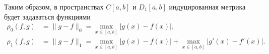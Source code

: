 Таким образом, в пространствах $ C[a,b] $ и $ D_1[a,b] $ индуцированная метрика
будет задаваться функциями  
\begin{align*}
  \rho_0(f, g) &= \|g - f\|_0 = \max_{x\in[a,b]}|g(x)-f(x)|,\\
  \rho_1(f, g) &= \|g - f \|_1 = \max_{x\in[a,b]}|g(x)-f(x)| +
  \max_{x\in[a,b]}|g'(x)-f'(x)|.
\end{align*}

